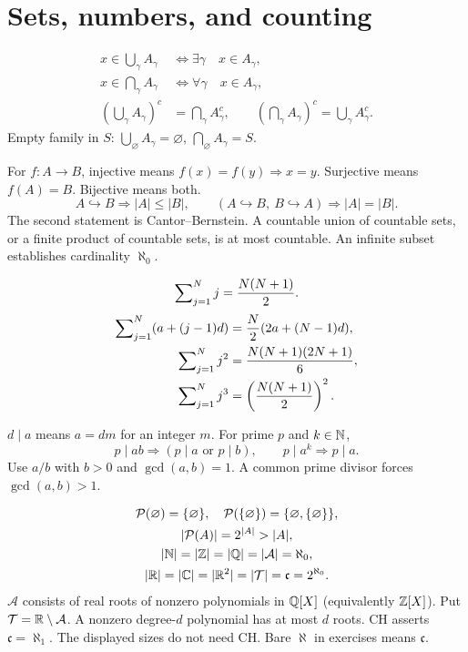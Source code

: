 \section{Sets, numbers, and counting}
\label{sec:appendix:formula-sheet-sets}
\[
  \begin{aligned}
    x\in\bigcup_\gamma A_\gamma&\iff\exists\gamma\quad x\in A_\gamma,\\
    x\in\bigcap_\gamma A_\gamma&\iff\forall\gamma\quad x\in A_\gamma,\\
    \left(\bigcup_\gamma A_\gamma\right)^c&=\bigcap_\gamma A_\gamma^c,\qquad
    \left(\bigcap_\gamma A_\gamma\right)^c=\bigcup_\gamma A_\gamma^c.
  \end{aligned}
\]
Empty family in $S$: $\bigcup_\varnothing A_\gamma=\varnothing$,
$\bigcap_\varnothing A_\gamma=S$.

For $f:A\to B$, injective means $f(x)=f(y)\Rightarrow x=y$.
Surjective means $f(A)=B$. Bijective means both.
\[
  A\hookrightarrow B\Rightarrow |A|\le|B|,\qquad
  (A\hookrightarrow B,\ B\hookrightarrow A)\Rightarrow |A|=|B|.
\]
The second statement is Cantor--Bernstein. A countable union of
countable sets, or a finite product of countable sets, is at most
countable. An infinite subset establishes cardinality $\aleph_0$.

\label{sec:appendix:formula-sheet-finite-sums}
\[
  \sum\nolimits_{j=1}^{N}j=\frac{N(N+1)}2.
\]
\ifdefined\standaloneformulasheet\else
\[
  \begin{aligned}
    \sum\nolimits_{j=1}^{N}(a+(j-1)d)&=\frac N2(2a+(N-1)d),\\
    \sum\nolimits_{j=1}^{N}j^2&=\frac{N(N+1)(2N+1)}6,\\
    \sum\nolimits_{j=1}^{N}j^3&=\left(\frac{N(N+1)}2\right)^2.
  \end{aligned}
\]
\fi

$d\mid a$ means $a=dm$ for an integer $m$.
For prime $p$ and $k\in\mathbb{N}$,
\[
  p\mid ab\Rightarrow(p\mid a\text{ or }p\mid b),\qquad
  p\mid a^k\Rightarrow p\mid a.
\]
Use $a/b$ with $b>0$ and $\gcd(a,b)=1$.
A common prime divisor forces $\gcd(a,b)>1$.

\[
  \begin{gathered}
    \mathcal P(\varnothing)=\{\varnothing\},\quad
    \mathcal P(\{\varnothing\})=\{\varnothing,\{\varnothing\}\},\\
    |\mathcal P(A)|=2^{|A|}>|A|,\\
    |\mathbb{N}|=|\mathbb{Z}|=|\mathbb{Q}|=|\mathcal A|=\aleph_0,\\
    |\mathbb{R}|=|\mathbb{C}|=|\mathbb{R}^2|=|\mathcal T|=\mathfrak c=2^{\aleph_0}.
  \end{gathered}
\]
$\mathcal A$ consists of real roots of nonzero polynomials in $\mathbb{Q}[X]$
(equivalently $\mathbb{Z}[X]$). Put $\mathcal T=\mathbb{R}\setminus\mathcal A$.
A nonzero degree-$d$ polynomial has at most $d$ roots.
CH asserts $\mathfrak c=\aleph_1$. The displayed sizes do not need CH.
Bare $\aleph$ in exercises means $\mathfrak c$.


